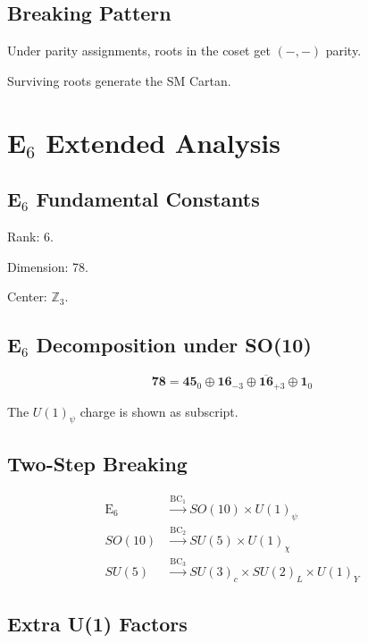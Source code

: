 \documentclass[11pt,a4paper]{article}
\begin{document}
\subsection{Breaking Pattern}

Under parity assignments, roots in the coset get $(-,-)$ parity.

Surviving roots generate the SM Cartan.

\section{E$_6$ Extended Analysis}
\label{app:e6-extended}

\subsection{E$_6$ Fundamental Constants}

Rank: 6.

Dimension: 78.

Center: $\mathbb{Z}_3$.

\subsection{E$_6$ Decomposition under SO(10)}

\begin{equation}
  \mathbf{78} = \mathbf{45}_0 \oplus \mathbf{16}_{-3} \oplus \overline{\mathbf{16}}_{+3}
    \oplus \mathbf{1}_0
  \label{eq:app-e6-decomp}
\end{equation}

The $U(1)_\psi$ charge is shown as subscript.

\subsection{Two-Step Breaking}

\begin{align}
  \text{E}_6 &\xrightarrow{\text{BC}_1} SO(10) \times U(1)_\psi
  \label{eq:e6-step1} \\
  SO(10) &\xrightarrow{\text{BC}_2} SU(5) \times U(1)_\chi
  \label{eq:e6-step2} \\
  SU(5) &\xrightarrow{\text{BC}_3} SU(3)_c \times SU(2)_L \times U(1)_Y
  \label{eq:e6-step3}
\end{align}

\subsection{Extra U(1) Factors}
\end{document}
